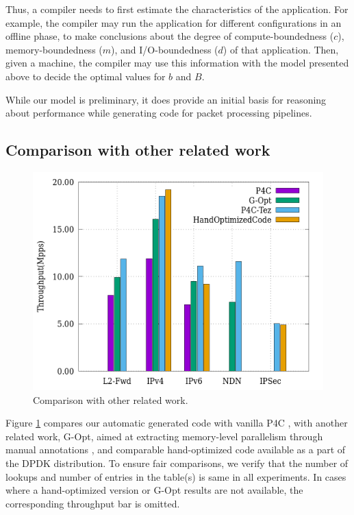 Thus, a compiler needs to first estimate the characteristics of the application. For example,
the compiler may run the application for different configurations in an offline
phase, to make conclusions about the degree of compute-boundedness ($c$), memory-boundedness ($m$),
and I/O-boundedness ($d$) of that application. Then, given a machine, the compiler may
use this information with the model
presented above to decide the optimal values for $b$ and $B$.

While our model is preliminary, it does provide an initial basis for reasoning about
performance while generating code for packet processing pipelines.

\subsection{Comparison with other related work}
\label{comparisonexperiment}
\begin{figure}[ht]
\includegraphics[width = \linewidth]{Figures/comparison.png}
\caption{Comparison with other related work.}
\label{comparisonfigure}
\end{figure}
Figure \ref{comparisonfigure} compares our automatic generated code with vanilla P4C \cite{Laki:2016:HSP:2934872.2959080},
with another
related work, G-Opt, aimed at extracting memory-level parallelism through manual annotations \cite{189006},
and comparable
hand-optimized code available as a part of the DPDK distribution.
To ensure fair comparisons, we verify that the number of lookups and number of entries in the table(s) is same in all experiments.
In cases where a hand-optimized version or G-Opt results are not available,
the corresponding throughput bar is omitted.

